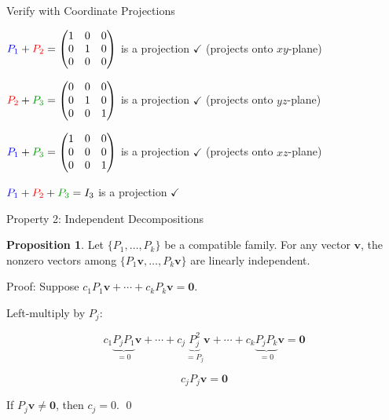 \documentclass[10pt]{beamer}
\theoremstyle{definition}
\newtheorem{prop}{Proposition}[section]
\newcommand{\gn}[1]{{\color{green!60!black}#1}}       %
\newcommand{\rd}[1]{{\color{red}#1}}                  %
\newcommand{\bl}[1]{{\color{blue}#1}}                 %
\begin{document}
\begin{frame}{Verify with Coordinate Projections}

$\bl{P_1} + \rd{P_2} = \begin{pmatrix} 1 & 0 & 0 \\ 0 & 1 & 0 \\ 0 & 0 & 0 \end{pmatrix}$ is a projection $\checkmark$ \quad (projects onto $xy$-plane)

\vspace{0.5em}

$\rd{P_2} + \gn{P_3} = \begin{pmatrix} 0 & 0 & 0 \\ 0 & 1 & 0 \\ 0 & 0 & 1 \end{pmatrix}$ is a projection $\checkmark$ \quad (projects onto $yz$-plane)

\vspace{0.5em}

$\bl{P_1} + \gn{P_3} = \begin{pmatrix} 1 & 0 & 0 \\ 0 & 0 & 0 \\ 0 & 0 & 1 \end{pmatrix}$ is a projection $\checkmark$ \quad (projects onto $xz$-plane)

\vspace{0.5em}

$\bl{P_1} + \rd{P_2} + \gn{P_3} = I_3$ is a projection $\checkmark$

\end{frame}


\begin{frame}{Property 2: Independent Decompositions}

\begin{prop}
Let $\{P_1, \ldots, P_k\}$ be a compatible family. For any vector $\mathbf{v}$, the nonzero vectors among $\{P_1\mathbf{v}, \ldots, P_k\mathbf{v}\}$ are linearly independent.
\end{prop}

\vspace{0.3em}

Proof: Suppose $c_1 P_1\mathbf{v} + \cdots + c_k P_k\mathbf{v} = \mathbf{0}$.

\vspace{0.3em}

Left-multiply by $P_j$:

$$c_1 \underbrace{P_j P_1}_{=0}\mathbf{v} + \cdots + c_j \underbrace{P_j^2}_{=P_j}\mathbf{v} + \cdots + c_k \underbrace{P_j P_k}_{=0}\mathbf{v} = \mathbf{0}$$

$$c_j P_j\mathbf{v} = \mathbf{0}$$

If $P_j\mathbf{v} \neq \mathbf{0}$, then $c_j = 0$. \qed

\end{frame}
\end{document}
